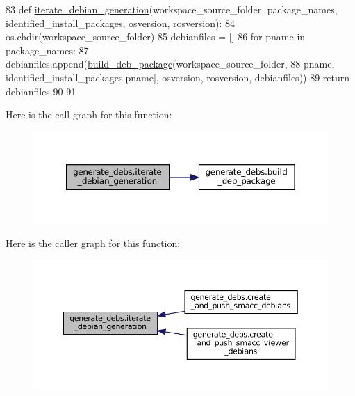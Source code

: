 \begin{DoxyCode}
83 \textcolor{keyword}{def }\hyperlink{namespacegenerate__debs_a2615a6fc7860b6aa9e920e6b4d886589}{iterate\_debian\_generation}(workspace\_source\_folder, package\_names, 
      identified\_install\_packages, osversion, rosversion):
84     os.chdir(workspace\_source\_folder)
85     debianfiles = []
86     \textcolor{keywordflow}{for} pname \textcolor{keywordflow}{in} package\_names:
87         debianfiles.append(\hyperlink{namespacegenerate__debs_aa70c3f4917ddc57b13eaed8501f571a8}{build\_deb\_package}(workspace\_source\_folder,
88                                              pname, identified\_install\_packages[pname], osversion, 
      rosversion, debianfiles))
89     \textcolor{keywordflow}{return} debianfiles
90 
91 
\end{DoxyCode}
Here is the call graph for this function\+:
\nopagebreak
\begin{figure}[H]
\begin{center}
\leavevmode
\includegraphics[width=350pt]{namespacegenerate__debs_a2615a6fc7860b6aa9e920e6b4d886589_cgraph}
\end{center}
\end{figure}
Here is the caller graph for this function\+:
\nopagebreak
\begin{figure}[H]
\begin{center}
\leavevmode
\includegraphics[width=350pt]{namespacegenerate__debs_a2615a6fc7860b6aa9e920e6b4d886589_icgraph}
\end{center}
\end{figure}
\mbox{\label{namespacegenerate__debs_a9b22f5ad65b40b7903c467eda308e575}} 
